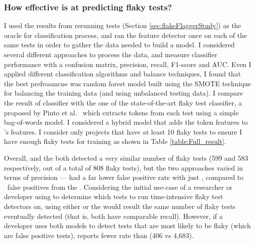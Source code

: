 \subsubsection{How effective is \sysName at predicting flaky tests?} 
\label{FlakeFlaggerRQ3}

I used the results from rerunning tests (Section \ref{sec:flakeFlaggerStudy}) as the oracle for \sysName classification process, and ran the feature detector once on each of the same tests in order to gather the data needed to build a model.
I considered several different approaches to process the data, and measure classifier performance with a confusion matrix, precision, recall, F1-score and AUC. Even I applied different classification algorithms and balance techniques, I found that the best prefroamcne was  random forest model built using the SMOTE technique for balancing the training data (and using unbalanced testing data). I compare the result of \sysName classifier with the one of the state-of-the-art flaky test classifier, a \vocabName proposed by Pinto et al.~\cite{pinto2020vocabulary} which extracts tokens from each test using a simple bag-of-words model. I considered a hybrid model that adds the token features to \sysName's features. I consider only projects that have at least 10 flaky tests to ensure I have enough flaky tests for training as shown in Table \ref{table:Full_result}. 

Overall, \sysName and the \vocabName  both detected a very similar number of flaky tests (599 and 583 respectively, out of a total of 808 flaky tests), but the two approaches varied in terms of precision --- \sysName had a far lower false positive rate with just \flaggerfp, compared to \msrfp~false positives from the \vocabName. Considering the initial use-case of a researcher or developer using \sysName to determine which tests to run time-intensive flaky test detectors on, using either \sysName or the \vocabName would result the same number of flaky tests eventually detected (that is, both have comparable recall).
However, if a developer uses both models to detect tests that are most likely to be flaky (which are false positive tests), \sysName reports fewer rate than \vocabName (406 vs 4,683).

